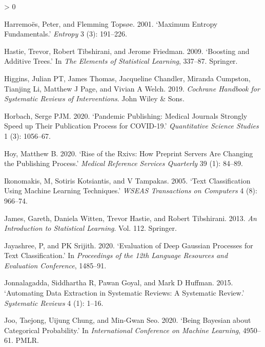 \documentclass{article}
\newlength{\cslhangindent}
\newenvironment{CSLReferences}[2] %
 {%
  \setlength{\parindent}{0pt}
  \ifodd #1 \everypar{\setlength{\hangindent}{\cslhangindent}}\ignorespaces\fi
  \ifnum #2 > 0
  \setlength{\parskip}{#2\baselineskip}
  \fi
 }%
 {}
\begin{document}
\begin{CSLReferences}{1}{0}
\leavevmode\hypertarget{ref-harremoes2001maximum}{}%
Harremoës, Peter, and Flemming Topsøe. 2001. {`Maximum Entropy
Fundamentals.'} \emph{Entropy} 3 (3): 191--226.

\leavevmode\hypertarget{ref-hastie2009boosting}{}%
Hastie, Trevor, Robert Tibshirani, and Jerome Friedman. 2009. {`Boosting
and Additive Trees.'} In \emph{The Elements of Statistical Learning},
337--87. Springer.

\leavevmode\hypertarget{ref-higgins2019cochrane}{}%
Higgins, Julian PT, James Thomas, Jacqueline Chandler, Miranda Cumpston,
Tianjing Li, Matthew J Page, and Vivian A Welch. 2019. \emph{Cochrane
Handbook for Systematic Reviews of Interventions}. John Wiley \& Sons.

\leavevmode\hypertarget{ref-horbach2020pandemic}{}%
Horbach, Serge PJM. 2020. {`Pandemic Publishing: Medical Journals
Strongly Speed up Their Publication Process for COVID-19.'}
\emph{Quantitative Science Studies} 1 (3): 1056--67.

\leavevmode\hypertarget{ref-hoy2020rise}{}%
Hoy, Matthew B. 2020. {`Rise of the Rxivs: How Preprint Servers Are
Changing the Publishing Process.'} \emph{Medical Reference Services
Quarterly} 39 (1): 84--89.

\leavevmode\hypertarget{ref-ikonomakis2005text}{}%
Ikonomakis, M, Sotiris Kotsiantis, and V Tampakas. 2005. {`Text
Classification Using Machine Learning Techniques.'} \emph{WSEAS
Transactions on Computers} 4 (8): 966--74.

\leavevmode\hypertarget{ref-james2013introduction}{}%
James, Gareth, Daniela Witten, Trevor Hastie, and Robert Tibshirani.
2013. \emph{An Introduction to Statistical Learning}. Vol. 112.
Springer.

\leavevmode\hypertarget{ref-jayashree2020evaluation}{}%
Jayashree, P, and PK Srijith. 2020. {`Evaluation of Deep Gaussian
Processes for Text Classification.'} In \emph{Proceedings of the 12th
Language Resources and Evaluation Conference}, 1485--91.

\leavevmode\hypertarget{ref-jonnalagadda2015automating}{}%
Jonnalagadda, Siddhartha R, Pawan Goyal, and Mark D Huffman. 2015.
{`Automating Data Extraction in Systematic Reviews: A Systematic
Review.'} \emph{Systematic Reviews} 4 (1): 1--16.

\leavevmode\hypertarget{ref-joo2020being}{}%
Joo, Taejong, Uijung Chung, and Min-Gwan Seo. 2020. {`Being Bayesian
about Categorical Probability.'} In \emph{International Conference on
Machine Learning}, 4950--61. PMLR.


\end{CSLReferences}
\end{document}
